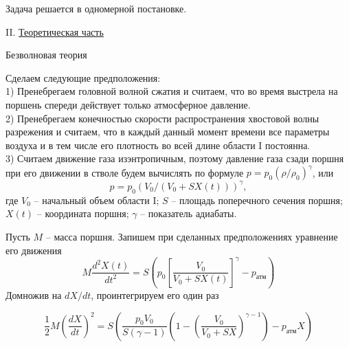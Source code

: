 \documentclass[specialist, subf, href, colorlinks=true, 14pt, final]{disser}
\theoremstyle{definition}
\begin{document}
Задача решается в одномерной постановке.
\begin{figure}[!htp]
  \caption{}
  \label{2-2-2}
\end{figure}

\noindent II. \underline{Теоретическая часть}

Безволновая теория

Сделаем следующие предположения:\\
1) Пренебрегаем головной волной сжатия и считаем, что во время выстрела на поршень спереди действует только атмосферное давление.\\
2) Пренебрегаем конечностью скорости распространения хвостовой волны разрежения и считаем, что в каждый данный момент времени все параметры воздуха и в тем числе его плотность во всей длине области I постоянна.\\
3) Считаем движение газа изэнтропичным, поэтому давление газа сзади поршня при его движении в стволе будем вычислять по формуле $p = p_0 (\rho / \rho_0)^\gamma $, или
\[
	p = p_0 ( V_0/ (V_0 +S X(t)))^\gamma ,
\]
где $V_0$ -- начальный объем области I; $S$ -- площадь поперечного сечения поршня; $X(t)$ -- координата поршня; $\gamma$ -- показатель адиабаты.

Пусть $M$ -- масса поршня. Запишем при сделанных предположениях уравнение его движения
\[
	M \frac{d^2 X(t)}{ dt^2} = S \left( p_0 \left[\frac{V_0}{V_0 + S X(t)}\right]^{\displaystyle \gamma} - p_{\text{атм}}\right) 
\]
Домножив на $dX/dt$, проинтегрируем его один раз
\addtocounter{equation}{1}
\begin{equation}\label{eq:221}
  \frac{1}{2}M\left(\frac{dX}{dt}\right)^2 = S \left( \frac{p_0V_0}{S (\gamma -1)}\left(1 - \left(\frac{V_0}{V_0 + S X}\right)^{ \displaystyle \gamma -1}\right) - p_{\text{атм}}X\right) 
  \tag{1}
\end{equation}
\end{document}
